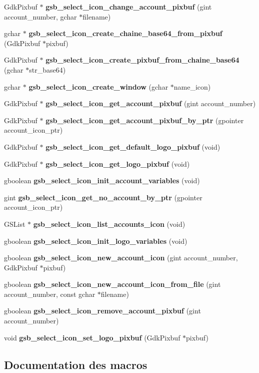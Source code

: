 \begin{DoxyCompactItemize}
\item 
GdkPixbuf $\ast$ {\bf gsb\_\-select\_\-icon\_\-change\_\-account\_\-pixbuf} (gint account\_\-number, gchar $\ast$filename)
\item 
gchar $\ast$ {\bf gsb\_\-select\_\-icon\_\-create\_\-chaine\_\-base64\_\-from\_\-pixbuf} (GdkPixbuf $\ast$pixbuf)
\item 
GdkPixbuf $\ast$ {\bf gsb\_\-select\_\-icon\_\-create\_\-pixbuf\_\-from\_\-chaine\_\-base64} (gchar $\ast$str\_\-base64)
\item 
gchar $\ast$ {\bf gsb\_\-select\_\-icon\_\-create\_\-window} (gchar $\ast$name\_\-icon)
\item 
GdkPixbuf $\ast$ {\bf gsb\_\-select\_\-icon\_\-get\_\-account\_\-pixbuf} (gint account\_\-number)
\item 
GdkPixbuf $\ast$ {\bf gsb\_\-select\_\-icon\_\-get\_\-account\_\-pixbuf\_\-by\_\-ptr} (gpointer account\_\-icon\_\-ptr)
\item 
GdkPixbuf $\ast$ {\bf gsb\_\-select\_\-icon\_\-get\_\-default\_\-logo\_\-pixbuf} (void)
\item 
GdkPixbuf $\ast$ {\bf gsb\_\-select\_\-icon\_\-get\_\-logo\_\-pixbuf} (void)
\item 
gboolean {\bf gsb\_\-select\_\-icon\_\-init\_\-account\_\-variables} (void)
\item 
gint {\bf gsb\_\-select\_\-icon\_\-get\_\-no\_\-account\_\-by\_\-ptr} (gpointer account\_\-icon\_\-ptr)
\item 
GSList $\ast$ {\bf gsb\_\-select\_\-icon\_\-list\_\-accounts\_\-icon} (void)
\item 
gboolean {\bf gsb\_\-select\_\-icon\_\-init\_\-logo\_\-variables} (void)
\item 
gboolean {\bf gsb\_\-select\_\-icon\_\-new\_\-account\_\-icon} (gint account\_\-number, GdkPixbuf $\ast$pixbuf)
\item 
gboolean {\bf gsb\_\-select\_\-icon\_\-new\_\-account\_\-icon\_\-from\_\-file} (gint account\_\-number, const gchar $\ast$filename)
\item 
gboolean {\bf gsb\_\-select\_\-icon\_\-remove\_\-account\_\-pixbuf} (gint account\_\-number)
\item 
void {\bf gsb\_\-select\_\-icon\_\-set\_\-logo\_\-pixbuf} (GdkPixbuf $\ast$pixbuf)
\end{DoxyCompactItemize}


\subsection{Documentation des macros}
